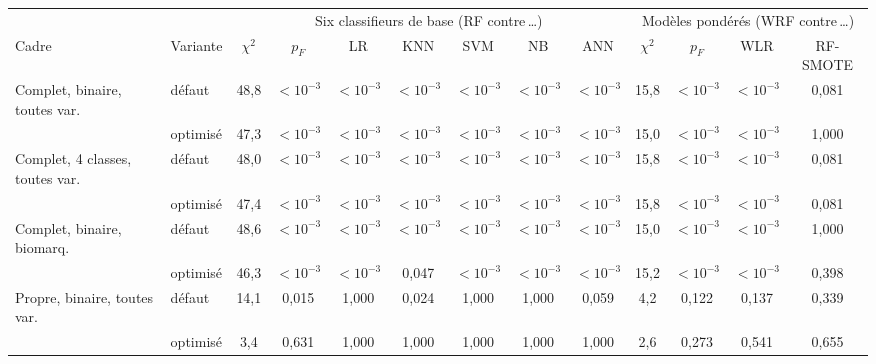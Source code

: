 \begin{tabular}{llccccccccccc}
\toprule
& & \multicolumn{7}{c}{Six classifieurs de base (RF contre\,\dots)} & \multicolumn{4}{c}{Modèles pondérés (WRF contre\,\dots)} \\\cmidrule(lr){3-9}\cmidrule(lr){10-13}
Cadre & Variante & $\chi^2$ & $p_F$ & LR & KNN & SVM & NB & ANN & $\chi^2$ & $p_F$ & WLR & RF-SMOTE \\
\midrule
Complet, binaire, toutes var. & défaut & 48,8 & $<\!10^{-3}$ & $<\!10^{-3}$ & $<\!10^{-3}$ & $<\!10^{-3}$ & $<\!10^{-3}$ & $<\!10^{-3}$ & 15,8 & $<\!10^{-3}$ & $<\!10^{-3}$ & 0,081 \\
 & optimisé & 47,3 & $<\!10^{-3}$ & $<\!10^{-3}$ & $<\!10^{-3}$ & $<\!10^{-3}$ & $<\!10^{-3}$ & $<\!10^{-3}$ & 15,0 & $<\!10^{-3}$ & $<\!10^{-3}$ & 1,000 \\
\midrule
Complet, 4 classes, toutes var. & défaut & 48,0 & $<\!10^{-3}$ & $<\!10^{-3}$ & $<\!10^{-3}$ & $<\!10^{-3}$ & $<\!10^{-3}$ & $<\!10^{-3}$ & 15,8 & $<\!10^{-3}$ & $<\!10^{-3}$ & 0,081 \\
 & optimisé & 47,4 & $<\!10^{-3}$ & $<\!10^{-3}$ & $<\!10^{-3}$ & $<\!10^{-3}$ & $<\!10^{-3}$ & $<\!10^{-3}$ & 15,8 & $<\!10^{-3}$ & $<\!10^{-3}$ & 0,081 \\
\midrule
Complet, binaire, biomarq. & défaut & 48,6 & $<\!10^{-3}$ & $<\!10^{-3}$ & $<\!10^{-3}$ & $<\!10^{-3}$ & $<\!10^{-3}$ & $<\!10^{-3}$ & 15,0 & $<\!10^{-3}$ & $<\!10^{-3}$ & 1,000 \\
 & optimisé & 46,3 & $<\!10^{-3}$ & $<\!10^{-3}$ & 0,047 & $<\!10^{-3}$ & $<\!10^{-3}$ & $<\!10^{-3}$ & 15,2 & $<\!10^{-3}$ & $<\!10^{-3}$ & 0,398 \\
\midrule
Propre, binaire, toutes var. & défaut & 14,1 & 0,015 & 1,000 & 0,024 & 1,000 & 1,000 & 0,059 & 4,2 & 0,122 & 0,137 & 0,339 \\
 & optimisé & 3,4 & 0,631 & 1,000 & 1,000 & 1,000 & 1,000 & 1,000 & 2,6 & 0,273 & 0,541 & 0,655 \\
\bottomrule
\end{tabular}